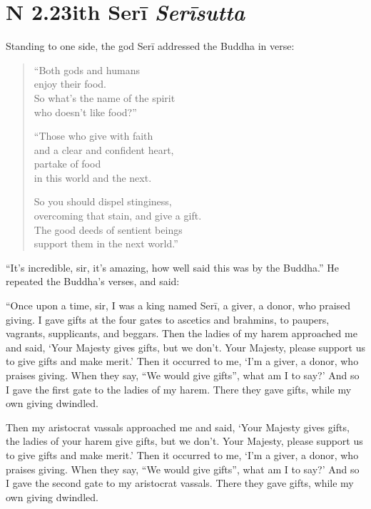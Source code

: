 \documentclass[12pt,openany]{book}%
\newcommand*{\suttatitleacronym}[1]{\smaller[2]{#1}\vspace*{.3em}}
\newcommand*{\suttatitletranslation}[1]{\linebreak{#1}}
\newcommand*{\suttatitleroot}[1]{\linebreak\smaller[2]\itshape{#1}}
\newcommand*{\tocacronym}[1]{\hspace*{-3.3em}{#1}\quad}
\newcommand*{\toctranslation}[1]{#1}
\newcommand*{\tocroot}[1]{(\textit{#1})}
\begin{document}
%
\section*{{\suttatitleacronym SN 2.23}{\suttatitletranslation With Serī }{\suttatitleroot Serīsutta}}
\addcontentsline{toc}{section}{\tocacronym{SN 2.23} \toctranslation{With Serī } \tocroot{Serīsutta}}

Standing to one side, the god \textsanskrit{Serī} addressed the Buddha in verse: 

\begin{verse}%
“Both gods and humans \\
enjoy their food. \\
So what’s the name of the spirit \\
who doesn’t like food?” 

“Those who give with faith \\
and a clear and confident heart, \\
partake of food \\
in this world and the next. 

So you should dispel stinginess, \\
overcoming that stain, and give a gift. \\
The good deeds of sentient beings \\
support them in the next world.” 

%
\end{verse}

“It’s incredible, sir, it’s amazing, how well said this was by the Buddha.” He repeated the Buddha’s verses, and said: 

“Once upon a time, sir, I was a king named \textsanskrit{Serī}, a giver, a donor, who praised giving. I gave gifts at the four gates to ascetics and brahmins, to paupers, vagrants, supplicants, and beggars. Then the ladies of my harem approached me and said, ‘Your Majesty gives gifts, but we don’t. Your Majesty, please support us to give gifts and make merit.’ Then it occurred to me, ‘I’m a giver, a donor, who praises giving. When they say, “We would give gifts”, what am I to say?’ And so I gave the first gate to the ladies of my harem. There they gave gifts, while my own giving dwindled. 

Then my aristocrat vassals approached me and said, ‘Your Majesty gives gifts, the ladies of your harem give gifts, but we don’t. Your Majesty, please support us to give gifts and make merit.’ Then it occurred to me, ‘I’m a giver, a donor, who praises giving. When they say, “We would give gifts”, what am I to say?’ And so I gave the second gate to my aristocrat vassals. There they gave gifts, while my own giving dwindled. 
\end{document}
